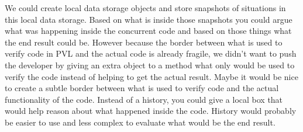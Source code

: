 We could create local data storage objects and store snapshots of situations in this local data storage. Based on what is inside those snapshots you could argue what was happening inside the concurrent code and based on those things what the end result could be. However because the border between what is used to verify code in PVL and the actual code is already fragile, we didn't want to push the developer by giving an extra object to a method what only would be used to verify the code instead of helping to get the actual result. Maybe it would be nice to create a subtle border between what is used to verify code and the actual functionality of the code. Instead of a history, you could give a local box that would help reason about what happened inside the code. History would probably be easier to use and less complex to evaluate what would be the end result.